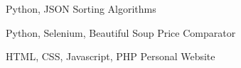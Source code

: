 

\begin{cventries}

      \cventry
        {Python, JSON} %
        {Sorting Algorithms} %
        {} %
        {} %
        {
          \begin{cvitems} %
            \item {}
          \end{cvitems}
        }

    \cventry
        {Python, Selenium, Beautiful Soup} %
        {Price Comparator} %
        {} %
        {} %
        {
        \begin{cvitems} %
            \item {}
        \end{cvitems}
        }

    \cventry
        {HTML, CSS, Javascript, PHP} %
        {Personal Website} %
        {} %
        {} %
        {
            \begin{cvitems} %
            \item {}
            \end{cvitems}
        }

    \end{cventries}
    